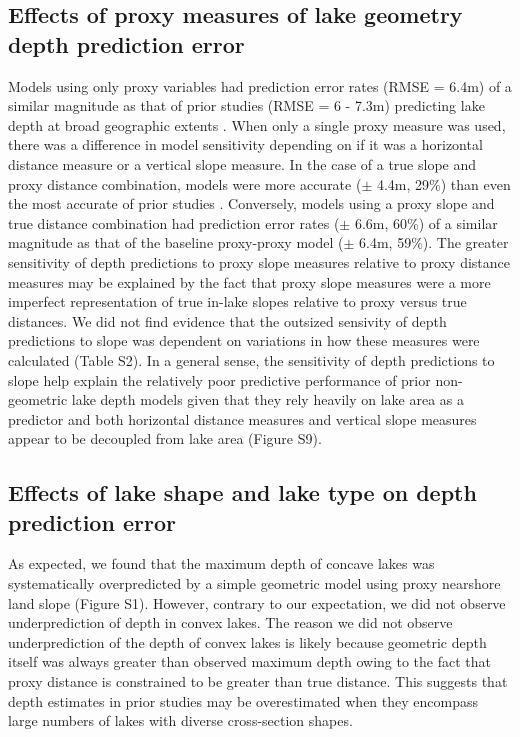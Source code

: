 \documentclass[draft]{agujournal2019}
\begin{document}
\subsection{Effects of proxy measures of lake geometry depth prediction error}
\noindent
Models using only proxy variables had prediction error rates (RMSE = 6.4m) of a similar magnitude as that of prior studies (RMSE = 6 - 7.3m) predicting lake depth at broad geographic extents \cite{hollisterPredictingMaximumLake2011, oliver2016prediction, messagerEstimatingVolumeAge2016}. When only a single proxy measure was used, there was a difference in model sensitivity depending on if it was a horizontal distance measure or a vertical slope measure. In the case of a true slope and proxy distance combination, models were more accurate ($\pm$ 4.4m, 29\%) than even the most accurate of prior studies \cite{hollisterPredictingMaximumLake2011, oliver2016prediction, messagerEstimatingVolumeAge2016}. Conversely, models using a proxy slope and true distance combination had prediction error rates ($\pm$ 6.6m, 60\%) of a similar magnitude as that of the baseline proxy-proxy model ($\pm$ 6.4m, 59\%). The greater sensitivity of depth predictions to proxy slope measures relative to proxy distance measures may be explained by the fact that proxy slope measures were a more imperfect representation of true in-lake slopes relative to proxy versus true distances. We did not find evidence that the outsized sensivity of depth predictions to slope was dependent on variations in how these measures were calculated (Table S2). In a general sense, the sensitivity of depth predictions to slope help explain the relatively poor predictive performance of prior non-geometric lake depth models given that they rely heavily on lake area as a predictor \cite{messagerEstimatingVolumeAge2016, oliver2016prediction, sobekPredictingDepthVolume2011} and both horizontal distance measures and vertical slope measures appear to be decoupled from lake area (Figure S9).

\subsection{Effects of lake shape and lake type on depth prediction error}
\noindent
As expected, we found that the maximum depth of concave lakes was systematically overpredicted by a simple geometric model using proxy nearshore land slope (Figure S1). However, contrary to our expectation, we did not observe underprediction of depth in convex lakes. The reason we did not observe underprediction of the depth of convex lakes is likely because geometric depth itself was always greater than observed maximum depth owing to the fact that proxy distance is constrained to be greater than true distance. This suggests that depth estimates in prior studies may be overestimated when they encompass large numbers of lakes with diverse cross-section shapes.
\end{document}
